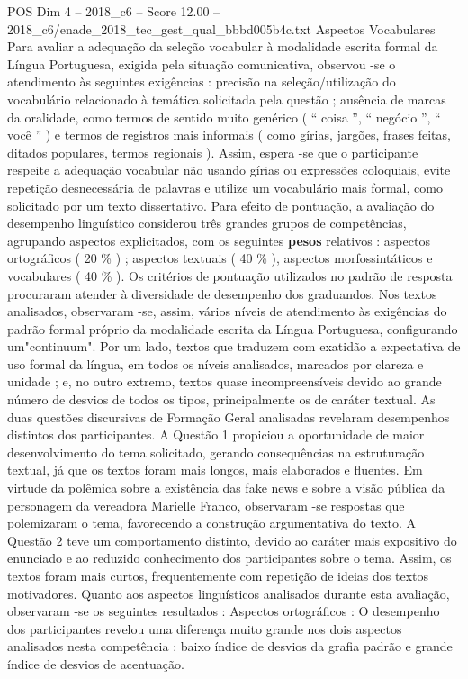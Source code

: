 \begin{textsample}{POS Dim 4 – 2018\_c6 – Score 12.00 – 2018\_c6/enade\_2018\_tec\_gest\_qual\_bbbd005b4c.txt}
Aspectos Vocabulares Para avaliar a adequação da seleção vocabular à modalidade escrita formal da Língua Portuguesa, exigida pela situação comunicativa, observou -se o atendimento às seguintes exigências : precisão na seleção/utilização do vocabulário relacionado à temática solicitada pela questão ; ausência de marcas da oralidade, como termos de sentido muito genérico ( “ coisa ”, “ negócio ”, “ você ” ) e termos de registros mais informais ( como gírias, jargões, frases feitas, ditados populares, termos regionais ).
Assim, espera -se que o participante respeite a adequação vocabular não usando gírias ou expressões coloquiais, evite repetição desnecessária de palavras e utilize um vocabulário mais formal, como solicitado por um texto dissertativo.
Para efeito de pontuação, a avaliação do desempenho linguístico considerou três grandes grupos de competências, agrupando aspectos explicitados, com os seguintes \textbf{pesos} relativos : aspectos ortográficos ( 20 \% ) ; aspectos textuais ( 40 \% ), aspectos morfossintáticos e vocabulares ( 40 \% ).
Os critérios de pontuação utilizados no padrão de resposta procuraram atender à diversidade de desempenho dos graduandos.
Nos textos analisados, observaram -se, assim, vários níveis de atendimento às exigências do padrão formal próprio da modalidade escrita da Língua Portuguesa, configurando um"continuum".
Por um lado, textos que traduzem com exatidão a expectativa de uso formal da língua, em todos os níveis analisados, marcados por clareza e unidade ; e, no outro extremo, textos quase incompreensíveis devido ao grande número de desvios de todos os tipos, principalmente os de caráter textual.
As duas questões discursivas de Formação Geral analisadas revelaram desempenhos distintos dos participantes.
A Questão 1 propiciou a oportunidade de maior desenvolvimento do tema solicitado, gerando consequências na estruturação textual, já que os textos foram mais longos, mais elaborados e fluentes.
Em virtude da polêmica sobre a existência das fake news e sobre a visão pública da personagem da vereadora Marielle Franco, observaram -se respostas que polemizaram o tema, favorecendo a construção argumentativa do texto.
A Questão 2 teve um comportamento distinto, devido ao caráter mais expositivo do enunciado e ao reduzido conhecimento dos participantes sobre o tema.
Assim, os textos foram mais curtos, frequentemente com repetição de ideias dos textos motivadores.
Quanto aos aspectos linguísticos analisados durante esta avaliação, observaram -se os seguintes resultados : Aspectos ortográficos : O desempenho dos participantes revelou uma diferença muito grande nos dois aspectos analisados nesta competência : baixo índice de desvios da grafia padrão e grande índice de desvios de acentuação.

\end{textsample}
